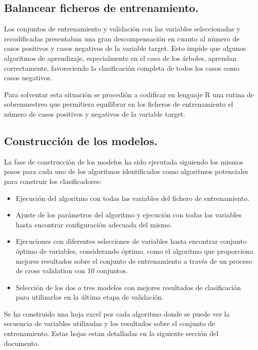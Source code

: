 \subsection{Balancear ficheros de entrenamiento.}

Los conjuntos de entrenamiento y validación con las variables seleccionadas y recodificadas presentaban una gran descompensación en cuanto al número de casos positivos y casos negativos de la variable target. Esto impide que algunos algoritmos de aprendizaje, especialmente en el caso de los árboles, aprendan correctamente, favoreciendo la clasificación completa de todos los casos como casos negativos. 

Para solventar esta situación se procedión a codificar en lenguaje R una rutina de sobremuestreo que permitiera equilibrar en los ficheros de entrenamiento el número de casos positivos y negativos de la variable target.

\subsection{Construcción de los modelos.}

La fase de construcción de los modelos ha sido ejecutada siguiendo los mismos pasos para cada uno de los algoritmos identificados como algoritmos potenciales para construir los clasificadores:

\begin{itemize}

\item{Ejecución del algoritmo con todas las variables del fichero de entrenamiento.}
\item{Ajuste de los parámetros del algoritmo y ejecución con todas las variables hasta encontrar configuración adecuada del mismo.}
\item{Ejecuciones con diferentes selecciones de variables hasta encontrar conjunto óptimo de variables, considerando óptimo, como el algoritmo que proporciona mejores resultados sobre el conjunto de entrenamiento a través de un proceso de cross validation con 10 conjuntos.}
\item{Selección de los dos o tres modelos con mejores resultados de clasificación para utilizarlos en la última etapa de validación.}

\end{itemize}

Se ha construido una hoja excel por cada algoritmo donde se puede ver la secuencia de variables utilizadas y los resultados sobre el conjunto de entrenamiento. Estas hojas estan detalladas en la siguiente sección del documento.

